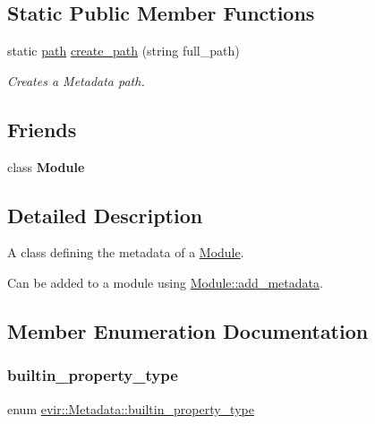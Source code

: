 \subsection*{Static Public Member Functions}
\begin{DoxyCompactItemize}
\item 
static \hyperlink{classevir_1_1Metadata_a0a3a8f0c937238fae5262283bac6286a}{path} \hyperlink{classevir_1_1Metadata_aa9244492c6a37b8b23191cc52c6b7e67}{create\+\_\+path} (string full\+\_\+path)
\begin{DoxyCompactList}\small\item\em Creates a Metadata path. \end{DoxyCompactList}\end{DoxyCompactItemize}
\subsection*{Friends}
\begin{DoxyCompactItemize}
\item 
\mbox{\label{classevir_1_1Metadata_a21f639900c480510650969df9c74d17d}} 
class {\bfseries Module}
\end{DoxyCompactItemize}


\subsection{Detailed Description}
A class defining the metadata of a \hyperlink{classevir_1_1Module}{Module}. 

Can be added to a module using \hyperlink{classevir_1_1Module_a8e8193a7ab86fb626058bd6135f8e2f8}{Module\+::add\+\_\+metadata}. 

\subsection{Member Enumeration Documentation}
\mbox{\label{classevir_1_1Metadata_a292423b7a2d93f70382d1da4929f55a0}} 
\subsubsection{\texorpdfstring{builtin\+\_\+property\+\_\+type}{builtin\_property\_type}}
{\footnotesize\ttfamily enum \hyperlink{classevir_1_1Metadata_a292423b7a2d93f70382d1da4929f55a0}{evir\+::\+Metadata\+::builtin\+\_\+property\+\_\+type}}



